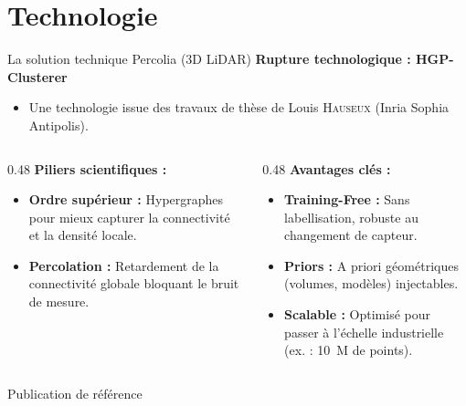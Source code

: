 \documentclass[A4,svgnames,9pt,aspectratio=169]{beamer}
\newif\ifshowsectionframe
\begin{document}
\showsectionframefalse
\section{Technologie}
\addtocounter{section}{-1}
\begin{frame}{La solution technique Percolia (3D LiDAR)}
    \textbf{\bleu Rupture technologique : HGP-Clusterer}
    \begin{itemize}
        \item Une technologie issue des travaux de thèse de Louis \textsc{Hauseux} (Inria Sophia Antipolis).
    \end{itemize}

    \vspace{0.1cm}
    \begin{columns}[T]
        \begin{column}{0.48\textwidth}
            \textbf{\orange Piliers scientifiques :}
            \begin{itemize}
                \item \textbf{Ordre supérieur :} Hypergraphes pour mieux capturer la connectivité et la densité locale.
                \item \textbf{Percolation :} Retardement de la connectivité globale bloquant le bruit de mesure.
            \end{itemize}
        \end{column}
        
        \begin{column}{0.48\textwidth}
            \textbf{\orange Avantages clés :}
            \begin{itemize}
                \item \textbf{Training-Free :} Sans labellisation, robuste au changement de capteur.
                \item \textbf{Priors :} A priori géométriques (volumes, modèles) injectables.
                \item \textbf{Scalable :} Optimisé pour passer à l'échelle industrielle (ex. : 10~M de points).
            \end{itemize}
        \end{column}
    \end{columns}
    
    \vspace{0.15cm}
    \begin{block}{Publication de référence}
        \scriptsize
    \end{block}
\end{frame}
\end{document}
